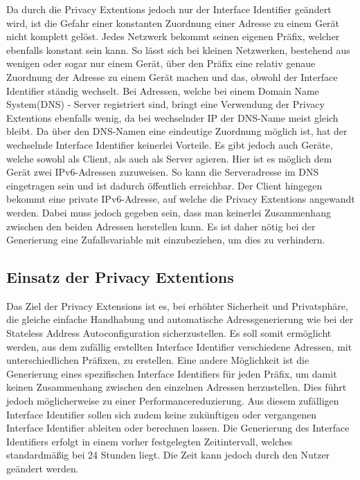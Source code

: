 \documentclass[a4paper, 12pt]{scrartcl}
\begin{document}
Da durch die Privacy Extentions jedoch nur der Interface Identifier geändert wird, ist die Gefahr einer konstanten Zuordnung einer Adresse zu einem Gerät nicht komplett gelöst.
Jedes Netzwerk bekommt seinen eigenen Präfix, welcher ebenfalls konstant sein kann. 
So lässt sich bei kleinen Netzwerken, bestehend aus wenigen oder sogar nur einem Gerät, über den Präfix eine relativ genaue Zuordnung der Adresse zu einem Gerät machen und das, obwohl der Interface Identifier ständig wechselt.
Bei Adressen, welche bei einem Domain Name System(DNS) - Server registriert sind, bringt eine Verwendung der Privacy Extentions ebenfalls wenig, da bei wechselnder IP der DNS-Name meist gleich bleibt.
Da über den DNS-Namen eine eindeutige Zuordnung möglich ist, hat der wechselnde Interface Identifier keinerlei Vorteile.
Es gibt jedoch auch Geräte, welche sowohl als Client, als auch als Server agieren. 
Hier ist es möglich dem Gerät zwei IPv6-Adressen zuzuweisen. So kann die Serveradresse im DNS eingetragen sein und ist dadurch öffentlich erreichbar. Der Client hingegen bekommt eine private IPv6-Adresse, auf welche die Privacy Extentions angewandt werden. Dabei muss jedoch gegeben sein, dass man keinerlei Zusammenhang zwischen den beiden Adressen herstellen kann. Es ist daher nötig bei der Generierung eine Zufallsvariable mit einzubeziehen, um dies zu verhindern.




\subsection{Einsatz der Privacy Extentions}
Das Ziel der Privacy Extensions ist es, bei erhöhter Sicherheit und Privatsphäre, die gleiche einfache Handhabung und automatische Adressgenerierung wie bei der Stateless Address Autoconfiguration sicherzustellen.
Es soll somit ermöglicht werden, aus dem zufällig erstellten Interface Identifier verschiedene Adressen, mit unterschiedlichen Präfixen, zu erstellen.
Eine andere Möglichkeit ist die Generierung eines spezifischen Interface Identifiers für jeden Präfix, um damit keinen Zusammenhang zwischen den einzelnen Adressen herzustellen.
Dies führt jedoch möglicherweise zu einer Performancereduzierung.
Aus diesem zufälligen Interface Identifier sollen sich zudem keine zukünftigen oder vergangenen Interface Identifier ableiten oder berechnen lassen.
Die Generierung des Interface Identifiers erfolgt in einem vorher festgelegten Zeitintervall, welches standardmäßig bei 24 Stunden liegt.
Die Zeit kann jedoch durch den Nutzer geändert werden.
\end{document}
